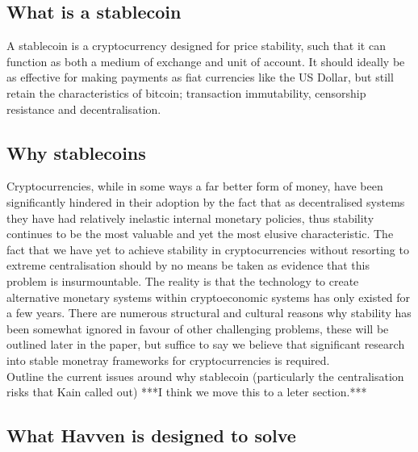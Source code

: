 \documentclass{article}
\begin{document}
\subsection{What is a stablecoin}

\noindent A stablecoin is a cryptocurrency designed for price stability, such that it can function as both a medium of exchange and unit of account. It should ideally be as effective for making payments as fiat currencies like the US Dollar, but still retain the characteristics of bitcoin; transaction immutability, censorship resistance and decentralisation. \\

\subsection{Why stablecoins}

\noindent Cryptocurrencies, while in some ways a far better form of money, have been significantly hindered in their adoption by the fact that as decentralised systems they have had relatively inelastic internal monetary policies, thus stability continues to be the most valuable and yet the most elusive characteristic. The fact that we have yet to achieve stability in cryptocurrencies without resorting to extreme centralisation should by no means be taken as evidence that this problem is insurmountable. The reality is that the technology to create alternative monetary systems within cryptoeconomic systems has only existed for a few years. There are numerous structural and cultural reasons why stability has been somewhat ignored in favour of other challenging problems, these will be outlined later in the paper, but suffice to say we believe that significant research into stable monetray frameworks for cryptocurrencies is required. \\

\noindent Outline the current issues around why stablecoin (particularly the centralisation risks that Kain called out) ***I think we move this to a leter section.*** \\

\subsection{What Havven is designed to solve}
\end{document}
